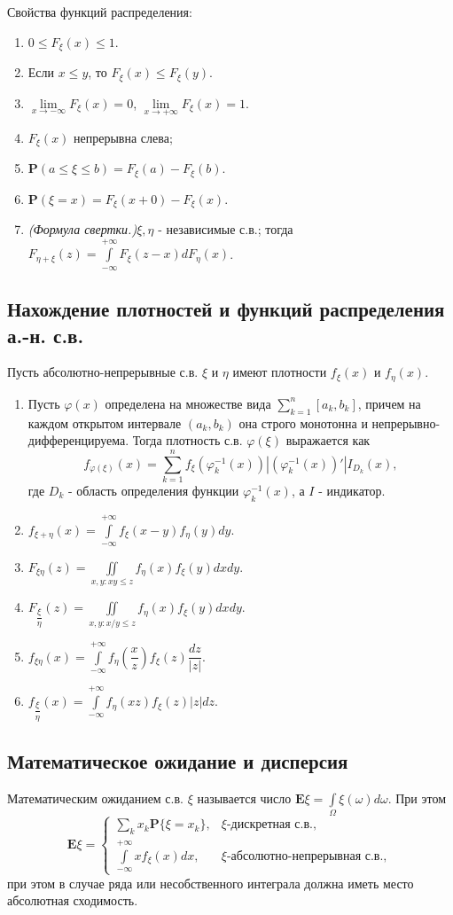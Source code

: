 \documentclass[a4paper,12pt]{scrartcl}
\newcommand{\E}{\mathbf{E}}
\newcommand{\Prb}{\mathbf{P}}
\begin{document}
Свойства функций распределения:
\begin{enumerate}
\item $0 \leqslant F_\xi(x) \leqslant 1.$
\item Если $x \leqslant y$, то $F_\xi(x) \leqslant F_\xi(y)$.
\item $\lim\limits_{x\to -\infty}F_\xi(x) = 0$, $\lim\limits_{x\to +\infty}F_\xi(x) = 1$.
\item $F_\xi(x)$ непрерывна слева;
\item $\Prb(a \leqslant \xi \leqslant b) = F_\xi(a) - F_\xi(b)$.
\item $\Prb(\xi = x) = F_\xi(x+0) - F_\xi(x)$.
\item \emph{(Формула свертки.)}$\xi, \eta $ - независимые с.в.; тогда $F_{\eta+\xi}(z) = \int\limits_{-\infty}^{+\infty}F_\xi(z-x)dF_\eta(x)$.
\end{enumerate}

\subsection{Нахождение плотностей и функций распределения а.-н. с.в.}
Пусть абсолютно-непрерывные с.в. $\xi$ и $\eta$ имеют плотности $f_\xi(x)$ и $f_\eta(x)$.

\begin{enumerate}
 \item Пусть $\varphi(x)$ определена на множестве вида $\sum\limits_{k=1}^{n}[a_k,b_k]$, причем на каждом открытом интервале $(a_k,b_k)$ она строго монотонна и непрерывно-дифференцируема. Тогда плотность с.в. $\varphi(\xi)$ выражается как 
$$f_{\varphi(\xi)}(x) = \sum\limits_{k=1}^{n}f_\xi(\varphi^{-1}_k(x))|(\varphi^{-1}_k(x))'|I_{D_k}(x), $$ где $D_k$ - область определения функции $\varphi^{-1}_k(x)$, а $I$ - индикатор. 
\item $f_{\xi+\eta}(x) = \int\limits_{-\infty}^{+\infty}f_\xi(x-y)f_\eta(y)dy$.
 \item $F_{\xi\eta}(z) = \iint\limits_{x,y: xy \leqslant z}f_\eta(x)f_\xi(y)dxdy$.
 \item $F_{\dfrac{\xi}{\eta}}(z) = \iint\limits_{x,y: x/y \leqslant z}f_\eta(x)f_\xi(y)dxdy$.
\item $f_{\xi\eta}(x) = \int\limits_{-\infty}^{+\infty}f_{\eta}\left(\dfrac{x}{z}\right)f_\xi(z)\dfrac{dz}{|z|}$.
\item $f_{\dfrac{\xi}{\eta}}(x) = \int\limits_{-\infty}^{+\infty}f_{\eta}(xz)f_\xi(z)|z|dz$.
\end{enumerate}
\subsection{Математическое ожидание и дисперсия}
Математическим ожиданием с.в. $\xi$ называется число $\E\xi = \int\limits_\Omega \xi(\omega)d\omega$. При этом $$\E\xi = \begin{cases} \sum\limits_{k}x_k\Prb\{\xi = x_k\},  & \xi \text{-дискретная с.в.,}\\ \int\limits_{-\infty}^{+\infty}xf_\xi(x)dx,& \xi \text{-абсолютно-непрерывная с.в.}, \end{cases}$$
при этом в случае ряда или несобственного интеграла должна иметь место абсолютная сходимость.
\end{document}
